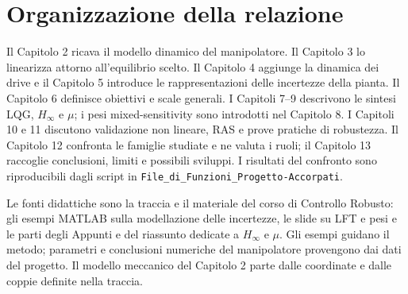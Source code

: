 \section{Organizzazione della relazione}
Il Capitolo 2 ricava il modello dinamico del manipolatore. Il
Capitolo 3 lo linearizza attorno all'equilibrio scelto. Il Capitolo 4
aggiunge la dinamica dei drive e il Capitolo 5 introduce le
rappresentazioni delle incertezze della pianta.
Il Capitolo 6 definisce obiettivi e scale generali. I Capitoli 7--9 descrivono le sintesi LQG, $H_\infty$ e $\mu$; i pesi mixed-sensitivity sono introdotti nel Capitolo 8. I Capitoli 10 e 11 discutono validazione non lineare, RAS e prove pratiche di robustezza. Il Capitolo 12 confronta le famiglie studiate e ne valuta i ruoli; il Capitolo 13 raccoglie conclusioni, limiti e possibili sviluppi. I risultati del confronto sono riproducibili dagli script in \texttt{File\_di\_Funzioni\_Progetto-Accorpati}.

Le fonti didattiche sono la traccia e il materiale del corso di Controllo
Robusto: gli esempi MATLAB sulla modellazione delle incertezze, le slide
su LFT e pesi e le parti degli Appunti e del riassunto dedicate a
$H_\infty$ e $\mu$. Gli esempi guidano il metodo; parametri e conclusioni
numeriche del manipolatore provengono dai dati del progetto.
Il modello meccanico del Capitolo 2 parte dalle coordinate e dalle coppie definite nella traccia.
